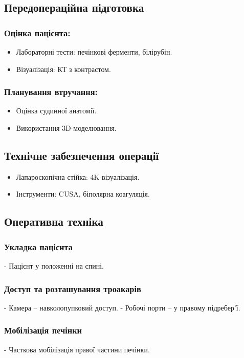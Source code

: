 \begin{refsection}
\subsection{Передопераційна підготовка}
\subsubsection{Оцінка пацієнта:}
\begin{itemize}
    \item Лабораторні тести: печінкові ферменти, білірубін.
    \item Візуалізація: КТ з контрастом.
\end{itemize}

\subsubsection{Планування втручання:}
\begin{itemize}
    \item Оцінка судинної анатомії.
    \item Використання 3D-моделювання.
\end{itemize}

\subsection{Технічне забезпечення операції}
\begin{itemize}
    \item Лапароскопічна стійка: 4K-візуалізація.
    \item Інструменти: CUSA, біполярна коагуляція.
\end{itemize}

\subsection{Оперативна техніка}
\subsubsection{Укладка пацієнта}
- Пацієнт у положенні на спині.

\subsubsection{Доступ та розташування троакарів}
- Камера – навколопупковий доступ.
- Робочі порти – у правому підребер'ї.

\subsubsection{Мобілізація печінки}
- Часткова мобілізація правої частини печінки.


\end{refsection}
